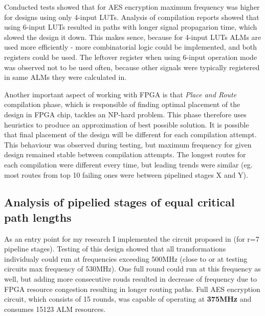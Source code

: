 Conducted tests showed that for AES encryption maximum frequency was higher for designs using only 4-input LUTs. Analysis of compilation reports showed that using 6-input LUTs resulted in paths with longer signal propagarion time, which slowed the design it down. This makes sence, because for 4-input LUTs ALMs are used more efficiently - more combinatorial logic could be implemented, and both registers could be used. The leftover register when using 6-input operation mode was observed not to be used often, because other signals were typically registered in same ALMs they were calculated in.

Another important aspect of working with FPGA is that \textit{Place and Route} compilation phase, which is responsible of finding optimal placement of the design in FPGA chip, tackles an NP-hard problem. This phase therefore uses heuristics to produce an approximation of best possible solution. It is possible that final placement of the design will be different for each compilation attempt. This behaviour was observed during testing, but maximum frequency for given design remained stable between compilation attempts. The longest routes for each compilation were different every time, but leading trends were similar (eg. most routes from top 10 failing ones were between pipelined stages X and Y).



\subsection{Analysis of pipelied stages of equal critical path lengths}
As an entry point for my research I implemented the circuit proposed in \cite[Fig. 11]{vlsi} (for r=7 pipeline stages). Testing of this design showed that all transformations individualy could run at frequencies exceeding 500MHz (close to or at testing circuits max frequency of 530MHz). One full round could run at this frequency as well, but adding more consecutive rouds resulted in decrease of frequency due to FPGA resource congestion resulting in longer routing paths. Full AES encryption circuit, which consists of 15 rounds, was capable of operating at \textbf{375MHz} and consumes 15123 ALM resources.

